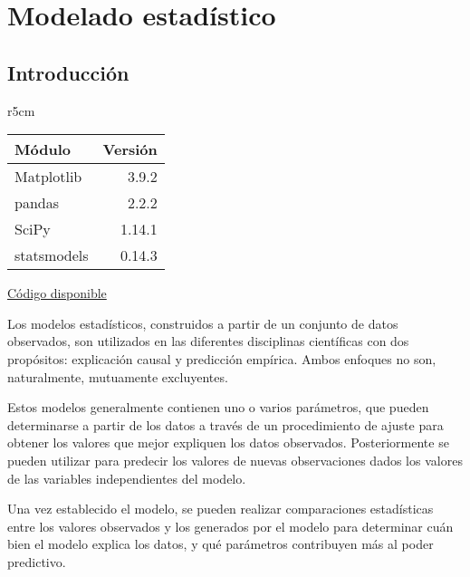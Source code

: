 

 \chapter{Modelado estadístico} \label{ch:modest}

 \section{Introducción}

\begin{wraptable}{r}{5cm}
\begin{modulesinfo}
\begin{center}
{\small
    \begin{tabular}{l r}
        \toprule
        \textbf{Módulo} & \textbf{Versión} \\
        \midrule
        Matplotlib & 3.9.2 \\
        pandas & 2.2.2 \\
        SciPy & 1.14.1 \\
        statsmodels & 0.14.3 \\
        \bottomrule
    \end{tabular}
    \vspace{0.75em}

    \href{https://github.com/facundobatista/libro-pyciencia/tree/master/código/modelado_estadistico/}{Código disponible}
}
\end{center}
\end{modulesinfo}
\end{wraptable}

Los modelos estadísticos, construidos a partir de un conjunto de datos observados, son utilizados en las diferentes disciplinas científicas con dos propósitos: explicación causal y predicción empírica. Ambos enfoques no son, naturalmente, mutuamente excluyentes.

Estos modelos generalmente contienen uno o varios parámetros, que pueden determinarse a partir de los datos a través de un procedimiento de ajuste para obtener los valores que mejor expliquen los datos observados. Posteriormente se pueden utilizar para predecir los valores de nuevas observaciones dados los valores de las variables independientes del modelo.

Una vez establecido el modelo, se pueden realizar comparaciones estadísticas entre los valores observados y los generados por el modelo para determinar cuán bien el modelo explica los datos, y qué parámetros contribuyen más al poder predictivo.


